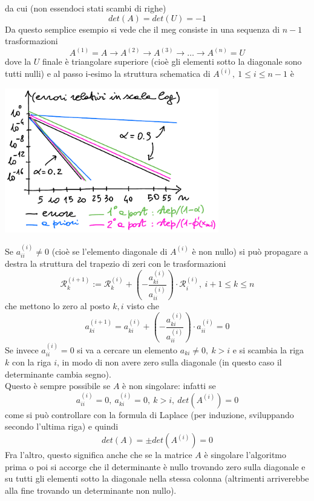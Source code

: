 da cui (non essendoci stati scambi di righe)
\begin{equation*}
    det(A) = det(U) = -1
\end{equation*}
Da questo semplice esempio si vede che il meg consiste in una sequenza di $n-1$ trasformazioni
\[
A^{(1)} = A \rightarrow A^{(2)} \rightarrow A^{(3)} \rightarrow \dotso \rightarrow A^{(n)} = U
\]
dove la $U$ finale è triangolare superiore (cioè gli elementi sotto la diagonale sono tutti nulli) e al passo i-esimo la struttura schematica di $A^{(i)}, \ 1 \le i \le n-1$ è
\begin{center}
    \includegraphics[width = 0.7\textwidth]{foto/pag16}
\end{center}
Se $a_{ii}^{(i)} \neq 0$ (cioè se l'elemento diagonale di $A^{(i)}$ è non nullo) si può propagare a destra la struttura del trapezio di zeri con le trasformazioni
\[
\mathcal{R}_k^{(i+1)} := \mathcal{R}_k^{(i)} + (-\frac{a_{ki}^{(i)}}{a_{ii}^{(i)}}) \cdot \mathcal{R}_i^{(i)}, \ i+1 \le k \le n
\]
che mettono lo zero al posto $k,i$ visto che
\[
a_{ki}^{(i+1)} = a_{ki}^{(i)} + (-\frac{a_{ki}^{(i)}}{a_{ii}^{(i)}}) \cdot a_{ii}^{(i)} = 0
\]
Se invece $a_{ii}^{(i)} = 0$ si va a cercare un elemento $a_{ki} \neq 0, \ k > i$ e si scambia la riga $k$ con la riga $i$, in modo di non avere zero sulla diagonale (in questo caso il determinante cambia segno).\\
Questo è sempre possibile se $A$ è non singolare: infatti se
\[ a_{ii}^{(i)} = 0, \ a_{ki}^{(i)} = 0,\ k > i, \ det(A^{(i)}) = 0 \]
come si può controllare con la formula di Laplace (per induzione, sviluppando secondo l'ultima riga) e quindi
\[ det(A) = \pm det(A^{(i)}) = 0 \]
Fra l'altro, questo significa anche che se la matrice $A$ è singolare l'algoritmo prima o poi si accorge che il determinante è nullo trovando zero sulla diagonale e su tutti gli elementi sotto la diagonale nella stessa colonna (altrimenti arriverebbe alla fine trovando un determinante non nullo).\\
